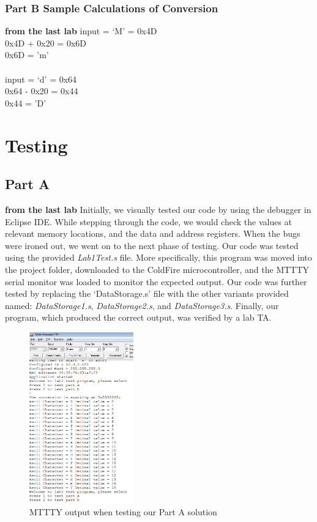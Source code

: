 \documentclass[letterpaper]{article}
\begin{document}

    \subsubsection{Part B Sample Calculations of Conversion}
\textbf{from the last lab}
    input = `M' = 0x4D\\
    0x4D + 0x20 = 0x6D\\
    0x6D = 'm'\\
    \\
    input = `d' = 0x64\\
    0x64 - 0x20 = 0x44\\
    0x44 = 'D'


\section{Testing}
  \subsection{Part A}
  \textbf{from the last lab}
    Initially, we visually tested our code by using the debugger in Eclipse IDE.
    While stepping through the code, we would check the values at relevant memory
    locations, and the data and address registers. When the bugs were ironed out,
    we went on to the next phase of testing.
    Our code was tested using the provided \textit{Lab1Test.s} file. More specifically,
    this program was moved into the project folder, downloaded to the ColdFire microcontroller,
    and the MTTTY serial monitor was loaded to monitor the expected output. Our code was
    further tested by replacing the `DataStorage.s' file with the other variants provided
    named: \textit{DataStorage1.s}, \textit{DataStorage2.s}, and \textit{DataStorage3.s}.
    Finally, our program, which produced the correct output, was verified by a lab TA.

    \begin{figure}[H]
      \centering
      \includegraphics[width=0.4\textwidth]{tst1a.png}
      \caption{MTTTY output when testing our Part A solution}
    \end{figure}
\end{document}
